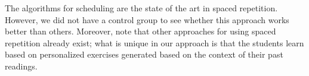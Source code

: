 
The algorithms for scheduling are the state of the art in spaced repetition. However, we did not have a control group to see whether this approach works better than others. Moreover, note that other approaches for using spaced repetition already exist; what is unique in our approach is that the students learn based on personalized exercises generated based on the context of their past readings.






